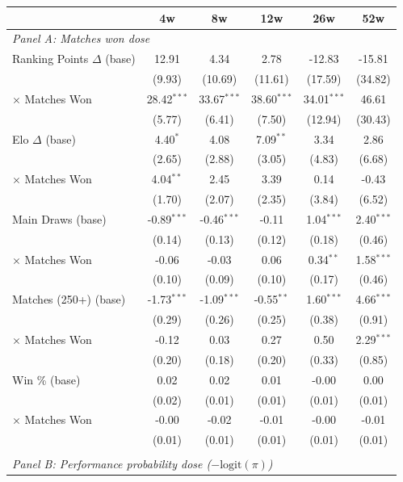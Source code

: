 \begin{tabular}{lccccc}
\toprule
 & 4w & 8w & 12w & 26w & 52w \\
\midrule
\multicolumn{6}{l}{\textit{Panel A: Matches won dose}} \\
\quad Ranking Points $\Delta$ (base) & 12.91 & 4.34 & 2.78 & -12.83 & -15.81 \\
 & (9.93) & (10.69) & (11.61) & (17.59) & (34.82) \\
\quad \quad $\times$ Matches Won & 28.42$^{***}$ & 33.67$^{***}$ & 38.60$^{***}$ & 34.01$^{***}$ & 46.61 \\
 & (5.77) & (6.41) & (7.50) & (12.94) & (30.43) \\[0.3em]
\quad Elo $\Delta$ (base) & 4.40$^{*}$ & 4.08 & 7.09$^{**}$ & 3.34 & 2.86 \\
 & (2.65) & (2.88) & (3.05) & (4.83) & (6.68) \\
\quad \quad $\times$ Matches Won & 4.04$^{**}$ & 2.45 & 3.39 & 0.14 & -0.43 \\
 & (1.70) & (2.07) & (2.35) & (3.84) & (6.52) \\[0.3em]
\quad Main Draws (base) & -0.89$^{***}$ & -0.46$^{***}$ & -0.11 & 1.04$^{***}$ & 2.40$^{***}$ \\
 & (0.14) & (0.13) & (0.12) & (0.18) & (0.46) \\
\quad \quad $\times$ Matches Won & -0.06 & -0.03 & 0.06 & 0.34$^{**}$ & 1.58$^{***}$ \\
 & (0.10) & (0.09) & (0.10) & (0.17) & (0.46) \\[0.3em]
\quad Matches (250+) (base) & -1.73$^{***}$ & -1.09$^{***}$ & -0.55$^{**}$ & 1.60$^{***}$ & 4.66$^{***}$ \\
 & (0.29) & (0.26) & (0.25) & (0.38) & (0.91) \\
\quad \quad $\times$ Matches Won & -0.12 & 0.03 & 0.27 & 0.50 & 2.29$^{***}$ \\
 & (0.20) & (0.18) & (0.20) & (0.33) & (0.85) \\[0.3em]
\quad Win \% (base) & 0.02 & 0.02 & 0.01 & -0.00 & 0.00 \\
 & (0.02) & (0.01) & (0.01) & (0.01) & (0.01) \\
\quad \quad $\times$ Matches Won & -0.00 & -0.02 & -0.01 & -0.00 & -0.01 \\
 & (0.01) & (0.01) & (0.01) & (0.01) & (0.01) \\[0.3em]
\\[0.5em]
\multicolumn{6}{l}{\textit{Panel B: Performance probability dose ($-\text{logit}(\pi)$)}} \\

\end{tabular}
